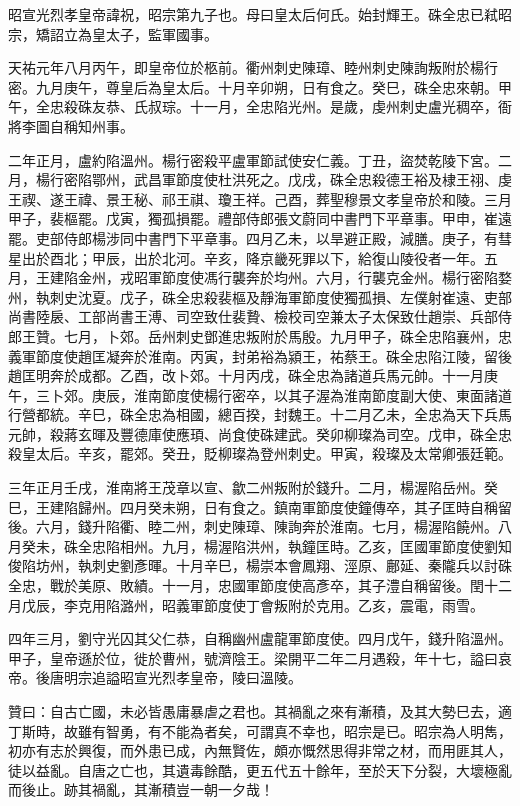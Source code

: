 \begin{pinyinscope}
 昭宣光烈孝皇帝諱祝，昭宗第九子也。母曰皇太后何氏。始封輝王。硃全忠已弒昭宗，矯詔立為皇太子，監軍國事。



 天祐元年八月丙午，即皇帝位於柩前。衢州刺史陳璋、睦州刺史陳詢叛附於楊行密。九月庚午，尊皇后為皇太后。十月辛卯朔，日有食之。癸巳，硃全忠來朝。甲午，全忠殺硃友恭、氏叔琮。十一月，全忠陷光州。是歲，虔州刺史盧光稠卒，衙將李圖自稱知州事。



 二年正月，盧約陷溫州。楊行密殺平盧軍節試使安仁義。丁丑，盜焚乾陵下宮。二月，楊行密陷鄂州，武昌軍節度使杜洪死之。戊戌，硃全忠殺德王裕及棣王祤、虔王禊、遂王禕、景王秘、祁王祺、瓊王祥。己酉，葬聖穆景文孝皇帝於和陵。三月甲子，裴樞罷。戊寅，獨孤損罷。禮部侍郎張文蔚同中書門下平章事。甲申，崔遠罷。吏部侍郎楊涉同中書門下平章事。四月乙未，以旱避正殿，減膳。庚子，有彗星出於酉北；甲辰，出於北河。辛亥，降京畿死罪以下，給復山陵役者一年。五月，王建陷金州，戎昭軍節度使馮行襲奔於均州。六月，行襲克金州。楊行密陷婺州，執刺史沈夏。戊子，硃全忠殺裴樞及靜海軍節度使獨孤損、左僕射崔遠、吏部尚書陸扆、工部尚書王溥、司空致仕裴贄、檢校司空兼太子太保致仕趙崇、兵部侍郎王贊。七月，卜郊。岳州刺史鄧進忠叛附於馬殷。九月甲子，硃全忠陷襄州，忠義軍節度使趙匡凝奔於淮南。丙寅，封弟裕為潁王，祐蔡王。硃全忠陷江陵，留後趙匡明奔於成都。乙酉，改卜郊。十月丙戌，硃全忠為諸道兵馬元帥。十一月庚午，三卜郊。庚辰，淮南節度使楊行密卒，以其子渥為淮南節度副大使、東面諸道行營都統。辛巳，硃全忠為相國，總百揆，封魏王。十二月乙未，全忠為天下兵馬元帥，殺蔣玄暉及豐德庫使應頊、尚食使硃建武。癸卯柳璨為司空。戊申，硃全忠殺皇太后。辛亥，罷郊。癸丑，貶柳璨為登州刺史。甲寅，殺璨及太常卿張廷範。



 三年正月壬戌，淮南將王茂章以宣、歙二州叛附於錢升。二月，楊渥陷岳州。癸巳，王建陷歸州。四月癸未朔，日有食之。鎮南軍節度使鐘傳卒，其子匡時自稱留後。六月，錢升陷衢、睦二州，刺史陳璋、陳詢奔於淮南。七月，楊渥陷饒州。八月癸未，硃全忠陷相州。九月，楊渥陷洪州，執鐘匡時。乙亥，匡國軍節度使劉知俊陷坊州，執刺史劉彥暉。十月辛巳，楊崇本會鳳翔、涇原、鄜延、秦隴兵以討硃全忠，戰於美原、敗績。十一月，忠國軍節度使高彥卒，其子澧自稱留後。閏十二月戊辰，李克用陷潞州，昭義軍節度使丁會叛附於克用。乙亥，震電，雨雪。



 四年三月，劉守光囚其父仁恭，自稱幽州盧龍軍節度使。四月戊午，錢升陷溫州。甲子，皇帝遜於位，徙於曹州，號濟陰王。梁開平二年二月遇殺，年十七，謚曰哀帝。後唐明宗追謚昭宣光烈孝皇帝，陵曰溫陵。



 贊曰：自古亡國，未必皆愚庸暴虐之君也。其禍亂之來有漸積，及其大勢巳去，適丁斯時，故雖有智勇，有不能為者矣，可謂真不幸也，昭宗是已。昭宗為人明雋，初亦有志於興復，而外患已成，內無賢佐，頗亦慨然思得非常之材，而用匪其人，徒以益亂。自唐之亡也，其遺毒餘酷，更五代五十餘年，至於天下分裂，大壞極亂而後止。跡其禍亂，其漸積豈一朝一夕哉！



\end{pinyinscope}